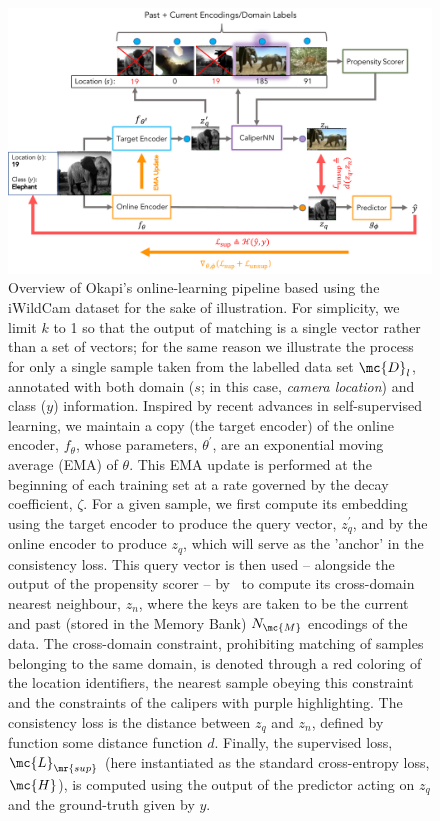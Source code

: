 \begin{figure}[ht]
  \centering
  \includegraphics[width=1\textwidth]{figures/ol_pipe_new_new.pdf}
  \caption{
  Overview of Okapi's online-learning pipeline based using the iWildCam dataset for the sake of
  illustration.
  For simplicity, we limit $k$ to 1 so that the output of matching is a single vector rather than a
  set of vectors; for the same reason we illustrate the process for only a single sample 
  taken from the labelled data set $\mc{D}_l$, annotated with both domain ($s$; in this case, \emph{camera
  location}) and class ($y$) information.
  Inspired by recent advances in self-supervised learning, we maintain a copy (the target encoder)
  of the online encoder, $f_\theta$, whose parameters, $\theta^\prime$, are an exponential moving
  average (EMA) of $\theta$. 
  This EMA update is performed at the beginning of each training set at a rate governed by the
  decay coefficient, $\zeta$. 
  For a given sample, we first compute its embedding using the target encoder to
  produce the query vector, $z_q^\prime$, and by the online encoder to produce $z_q$, which will
  serve as the 'anchor' in the consistency loss. 
  This query vector is then used -- alongside the output of the propensity scorer -- by \CNN\ to
  compute its cross-domain nearest neighbour, $z_n$, where the keys are taken to be the current and
  past (stored in the Memory Bank) $N_\mc{M}$ encodings of the data.
  The cross-domain constraint, prohibiting matching of samples belonging to the same domain,
  is denoted through a red coloring of the location identifiers, the nearest sample obeying
  this constraint and the constraints of the calipers with purple highlighting.
  The consistency loss is the distance between $z_q$ and $z_n$, defined by function some distance
  function $d$. 
  Finally, the supervised loss, $\mc{L}_\mr{sup}$ (here instantiated as the standard cross-entropy loss, $\mc{H}$), is computed using the output of the predictor
  acting on $z_q$ and the ground-truth given by $y$.
%
  }
  \label{fig:pipeline}
\end{figure}
